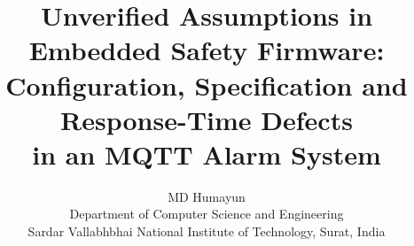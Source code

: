 %
%
%
%
\documentclass[11pt,a4paper]{article}
\usepackage[margin=1in]{geometry}
\usepackage{times}
\usepackage{amsmath,amssymb}
\usepackage{booktabs}
\usepackage{graphicx}
\usepackage{algorithm}
\usepackage{algpseudocode}
\usepackage[hidelinks]{hyperref}
\usepackage{caption}
\captionsetup{font=small,labelfont=bf}
\usepackage{enumitem}
\graphicspath{{../docs/images/}{../experiments/results/}{./}}

\title{\textbf{Unverified Assumptions in Embedded Safety Firmware:\\
Configuration, Specification and Response-Time Defects\\
in an MQTT Alarm System}}

\author{MD Humayun\\
\small Department of Computer Science and Engineering\\
\small Sardar Vallabhbhai National Institute of Technology, Surat, India}
\date{}


\maketitle

